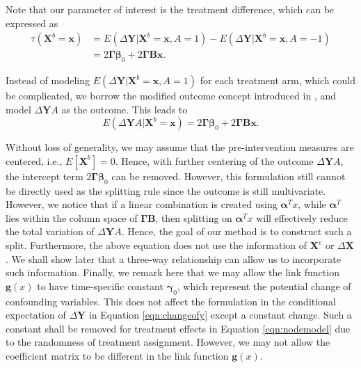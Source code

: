 \documentclass[smallextended]{svjour3}
\begin{document}
Note that our parameter of interest is the treatment difference, which can be expressed as
\begin{align}
    \tau( \bm X^b = \bm{x}) &= E(\Delta \bm{Y}|\bm X^b = \bm x, A = 1) - E(\Delta \bm{Y}|\bm X^b = \bm x, A = -1) \nonumber \\
    &= 2 \bm \Gamma \boldsymbol \beta_0 + 2 \bm \Gamma \bm B \bm x. \label{eqn:treatmenteffect}
\end{align}

Instead of modeling $E(\Delta \bm{Y}|\bm X^b = \bm x, A = 1)$ for each treatment arm, which could be complicated, we borrow the modified outcome concept introduced in \cite{tian2014simple}, and model $\Delta \bm{Y} A$ as the outcome. This leads to
\begin{equation}
E(\Delta \bm Y A | \bm X^b = \bm x) = 2 \bm \Gamma \boldsymbol \beta_0 + 2 \bm \Gamma \bm B \bm x. \label{eqn:nodemodel}
\end{equation}

Without loss of generality, we may assume that the pre-intervention measures are centered, i.e., $E[\bm X^b] = 0$. Hence, with further centering of the outcome $\Delta \bm Y A$, the intercept term $2 \bm \Gamma \boldsymbol \beta_0$ can be removed. However, this formulation still cannot be directly used as the splitting rule since the outcome is still multivariate. However, we notice that if a linear combination is created using $\bm \alpha^T x$, while $\bm \alpha^T$ lies within the column space of $\bm \Gamma \bm B$, then splitting on $\bm \alpha^T x$ will effectively reduce the total variation of $\Delta \bm Y A$. Hence, the goal of our method is to construct such a split. Furthermore, the above equation does not use the information of $\bm X^e$ or $\Delta \bm X$. We shall show later that a three-way relationship can allow us to incorporate such information. Finally, we remark here that we may allow the link function $\bm g(x)$ to have time-specific constant $\bm \gamma_0$, which represent the potential change of confounding variables. This does not affect the formulation in the conditional expectation of $\Delta \bm Y$ in Equation \eqref{eqn:changeofy} except a constant change. Such a constant shall be removed for treatment effects in Equation \eqref{eqn:nodemodel} due to the randomness of treatment assignment. However, we may not allow the coefficient matrix to be different in the link function $\bm g(x)$.
\end{document}
